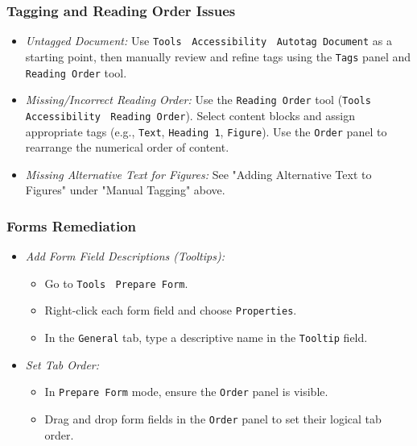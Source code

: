\begin{itemize}
\subsubsection{Tagging and Reading Order Issues}
\label{subsubsec:tagging-reading-order}

\begin{itemize}
\item \emph{Untagged Document:} Use \texttt{Tools} $\>$ \texttt{Accessibility} $\>$ \texttt{Autotag Document} as a starting point, then manually review and refine tags using the \texttt{Tags} panel and \texttt{Reading Order} tool.
\item \emph{Missing/Incorrect Reading Order:} Use the \texttt{Reading Order} tool (\texttt{Tools} $\>$ \texttt{Accessibility} $\>$ \texttt{Reading Order}). Select content blocks and assign appropriate tags (e.g., \texttt{Text}, \texttt{Heading 1}, \texttt{Figure}). Use the \texttt{Order} panel to rearrange the numerical order of content.
\item \emph{Missing Alternative Text for Figures:} See "Adding Alternative Text to Figures" under "Manual Tagging" above.
\end{itemize}

\subsubsection{Forms Remediation}
\label{subsubsec:forms-remediation}

\begin{itemize}
\item \emph{Add Form Field Descriptions (Tooltips):}
    \begin{itemize}
    \item Go to \texttt{Tools} $\>$ \texttt{Prepare Form}.
    \item Right-click each form field and choose \texttt{Properties}.
    \item In the \texttt{General} tab, type a descriptive name in the \texttt{Tooltip} field.
    \end{itemize}
\item \emph{Set Tab Order:}
    \begin{itemize}
    \item In \texttt{Prepare Form} mode, ensure the \texttt{Order} panel is visible.
    \item Drag and drop form fields in the \texttt{Order} panel to set their logical tab order.
    \end{itemize}
\end{itemize}


\end{itemize}
